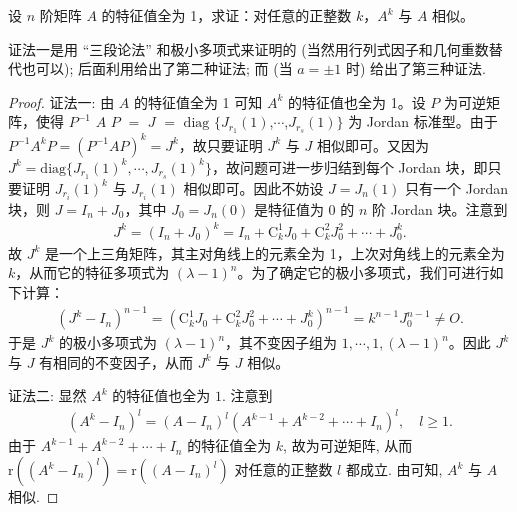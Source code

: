 \documentclass[../../main.tex]{subfiles}%
\begin{document}
\begin{proposition}\label{example:特征值全为1矩阵的任意幂次于原矩阵相似}
设 \(n\) 阶矩阵 \(A\) 的特征值全为 1，求证：对任意的正整数 \(k\)，\(A^k\) 与 \(A\) 相似。
\end{proposition}
\begin{remark}
{\color{blue}证法一}是用 “三段论法” 和极小多项式来证明的 (当然用行列式因子和几何重数替代也可以); 后面利用给出了第二种证法; 而 (当 $a = \pm 1$ 时) 给出了第三种证法. 
\end{remark}
\begin{proof}

{\color{blue}证法一:}
由 \(A\) 的特征值全为 1 可知 \(A^k\) 的特征值也全为 1。设 \(P\) 为可逆矩阵，使得 $P^{-1}$ $A$ $P$ $=$ $J$ $=$ $\mathrm{diag}$ $\{J_{r_1}(1)$,$\cdots$,$J_{r_s}(1)\}$ 为 Jordan 标准型。由于 \(P^{-1}A^kP=(P^{-1}AP)^k = J^k\)，故只要证明 \(J^k\) 与 \(J\) 相似即可。又因为 \(J^k=\mathrm{diag}\{J_{r_1}(1)^k,\cdots,J_{r_s}(1)^k\}\)，故问题可进一步归结到每个 Jordan 块，即只要证明 \(J_{r_i}(1)^k\) 与 \(J_{r_i}(1)\) 相似即可。因此不妨设 \(J = J_n(1)\) 只有一个 Jordan 块，则 \(J = I_n+J_0\)，其中 \(J_0 = J_n(0)\) 是特征值为 0 的 \(n\) 阶 Jordan 块。注意到
\begin{align*}
J^k=(I_n + J_0)^k
=I_n + \mathrm{C}_k^1J_0 + \mathrm{C}_k^2J_0^2+\cdots+J_0^k.
\end{align*}
故 \(J^k\) 是一个上三角矩阵，其主对角线上的元素全为 1，上次对角线上的元素全为 \(k\)，从而它的特征多项式为 \((\lambda - 1)^n\)。为了确定它的极小多项式，我们可进行如下计算：
\begin{align*}
(J^k - I_n)^{n - 1}=(\mathrm{C}_k^1J_0 + \mathrm{C}_k^2J_0^2+\cdots+J_0^k)^{n - 1}
=k^{n - 1}J_0^{n - 1}\neq O.
\end{align*}
于是 \(J^k\) 的极小多项式为 \((\lambda - 1)^n\)，其不变因子组为 \(1,\cdots,1,(\lambda - 1)^n\)。因此 \(J^k\) 与 \(J\) 有相同的不变因子，从而 \(J^k\) 与 \(J\) 相似。

{\color{blue}证法二:}
显然 $A^k$ 的特征值也全为 $1$. 注意到
\begin{align*}
(A^k - I_n)^l = (A - I_n)^l(A^{k - 1} + A^{k - 2} + \cdots + I_n)^l, \quad l \geqslant  1.
\end{align*}
由于 $A^{k - 1} + A^{k - 2} + \cdots + I_n$ 的特征值全为 $k$, 故为可逆矩阵, 从而 $\mathrm{r}((A^k - I_n)^l) = \mathrm{r}((A - I_n)^l)$ 对任意的正整数 $l$ 都成立. 由可知, $A^k$ 与 $A$ 相似. 

\end{proof}
\end{document}
